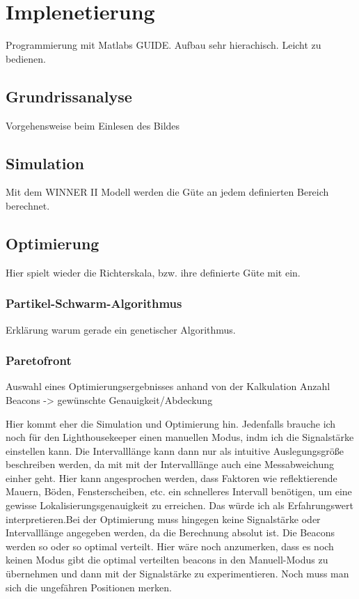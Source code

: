 \section{Implenetierung}
Programmierung mit Matlabs GUIDE. Aufbau sehr hierachisch. Leicht zu bedienen. 
\subsection{Grundrissanalyse}
Vorgehensweise beim Einlesen des Bildes
\subsection{Simulation}
Mit dem WINNER II Modell werden die Güte an jedem definierten Bereich berechnet.
\subsection{Optimierung}
Hier spielt wieder die Richterskala, bzw. ihre definierte Güte mit ein.
\subsubsection{Partikel-Schwarm-Algorithmus}
Erklärung warum gerade ein genetischer Algorithmus. 
\subsubsection{Paretofront}
Auswahl eines Optimierungsergebnisses anhand von der Kalkulation Anzahl Beacons -> gewünschte Genauigkeit/Abdeckung

Hier kommt eher die Simulation und Optimierung hin. Jedenfalls brauche ich noch für den Lighthousekeeper einen manuellen Modus, indm ich die Signalstärke einstellen kann. Die Intervalllänge kann dann nur als intuitive Auslegungsgröße beschreiben werden, da mit mit der Intervalllänge auch eine Messabweichung einher geht. Hier kann angesprochen werden, dass Faktoren wie reflektierende Mauern, Böden, Fensterscheiben, etc. ein schnelleres Intervall benötigen, um eine gewisse Lokalisierungsgenauigkeit zu erreichen. Das würde ich als Erfahrungswert interpretieren.Bei der Optimierung muss hingegen keine Signalstärke oder Intervalllänge angegeben werden, da die Berechnung absolut ist. Die Beacons werden so oder so optimal verteilt. Hier wäre noch anzumerken, dass es noch keinen Modus gibt die optimal verteilten beacons in den Manuell-Modus zu übernehmen und dann mit der Signalstärke zu experimentieren. Noch muss man sich die ungefähren Positionen merken.






